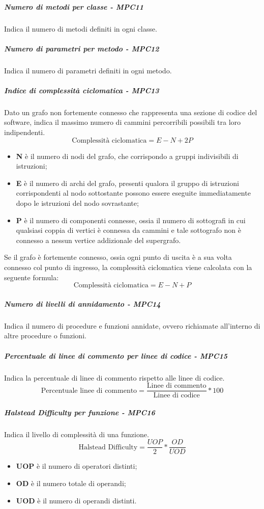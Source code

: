 \subparagraph{Numero di metodi per classe - MPC11}
Indica il numero di metodi definiti in ogni classe.
\subparagraph{Numero di parametri per metodo - MPC12}
Indica il numero di parametri definiti in ogni metodo.
\subparagraph{Indice di complessità ciclomatica - MPC13}
Dato un grafo non fortemente connesso che rappresenta una sezione di codice del software, indica il massimo numero di cammini percorribili possibili tra loro indipendenti.
\begin{equation*}
\text{Complessità ciclomatica} = E - N + 2P
\end{equation*}
\begin{itemize}
	\item \textbf{N} è il numero di nodi del grafo, che corrispondo a gruppi indivisibili di istruzioni;
	\item \textbf{E} è il numero di archi del grafo, presenti qualora il gruppo di istruzioni corrispondenti al nodo sottostante possono essere eseguite immediatamente dopo le istruzioni del nodo sovrastante;
	\item \textbf{P} è il numero di componenti connesse, ossia il numero di sottografi in cui qualsiasi coppia di vertici è connessa da cammini e tale sottografo non è connesso a nessun vertice addizionale del supergrafo. \\
\end{itemize}
Se il grafo è fortemente connesso, ossia ogni punto di uscita è a sua volta connesso col punto di ingresso, la complessità ciclomatica viene calcolata con la seguente formula:
\begin{equation*}
\text{Complessità ciclomatica} = E - N + P
\end{equation*}
\subparagraph{Numero di livelli di annidamento - MPC14}
Indica il numero di procedure e funzioni annidate, ovvero richiamate all'interno di altre procedure o funzioni.
\subparagraph{Percentuale di linee di commento per linee di codice - MPC15}
Indica la percentuale di linee di commento rispetto alle linee di codice.
\begin{equation*}
\text{Percentuale linee di commento} = \frac{\text{Linee di commento}}{\text{Linee di codice}} * 100
\end{equation*}
\subparagraph{Halstead Difficulty per funzione - MPC16}
Indica il livello di complessità di una funzione.
\begin{equation*}
\text{Halstead Difficulty} = \frac{UOP}{2} * \frac{OD}{UOD}
\end{equation*}	
\begin{itemize}
	\item \textbf{UOP} è il numero di operatori distinti;
	\item \textbf{OD} è il numero totale di operandi;
	\item \textbf{UOD} è il numero di operandi distinti.
\end{itemize}
